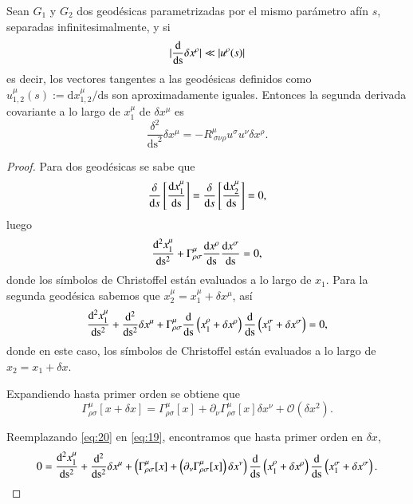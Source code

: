 \begin{theorem}
\label{teo:1}
Sean $G_1$ y $G_2$ dos geodésicas parametrizadas por el mismo parámetro afín $s$, separadas infinitesimalmente, y si 
$$|\dv{ }{ \mathrm{s} } \delta x^{\rho}| \ll |u^{\rho}(s)|$$
es decir, los vectores tangentes a las geodésicas definidos como $u^{\mu}_{1,2}(s) := \mathrm{d}x^{\mu}_{1,2}/\mathrm{ds}$ son aproximadamente iguales. Entonces la segunda derivada covariante a lo largo de $x^{\mu}_1$ de $\delta x^{\mu}$ es
\begin{equation}
\label{eq:17}
\frac{\delta^2}{\mathrm{ds}^2}\delta x^{\mu} = - R^{\mu}_{\ \sigma \nu \rho} u^{\sigma} u^{\nu} \delta x^{\rho}.
\end{equation}
\end{theorem}
\begin{proof}
Para dos geodésicas se sabe que
\begin{equation}
\frac{\delta  }{\mathrm{d}s}\left[ \dv{x_1^{\mu}}{\mathrm{s}} \right] = \frac{\delta  }{\mathrm{d}s}\left[ \dv{x_2^{\mu}}{\mathrm{s}} \right] = 0,
\end{equation}
luego
\begin{equation}
\label{eq:18}
\dv[2]{x_1^{\mu}}{\mathrm{s}} + \Gamma^{\mu}_{\rho \sigma} \dv{x^{\rho}}{\mathrm{s}} \dv{x^{\sigma}}{\mathrm{s}} = 0,
\end{equation}
donde los símbolos de Christoffel están evaluados a lo largo de $x_1$. Para la segunda geodésica sabemos que $x_2^{\mu} = x_1^{\mu} + \delta x^{\mu}$, así
\begin{equation}
\label{eq:19}
\dv[2]{x_1^{\mu}}{\mathrm{s}} + \dv[2]{ }{\mathrm{s}} \delta x^{\mu} + \Gamma^{\mu}_{\rho \sigma} \dv{ }{\mathrm{s}} \left( x_1^{\rho} + \delta x^{\rho} \right) \dv{ }{\mathrm{s}} \left( x_1^{\sigma} + \delta x^{\sigma} \right) = 0,
\end{equation}
donde en este caso, los símbolos de Christoffel están evaluados a lo largo de $x_2=x_1 + \delta x$. 

Expandiendo hasta primer orden se obtiene que
\begin{equation}
\label{eq:20}
\Gamma^{\mu}_{\rho \sigma}[x + \delta x] = \Gamma^{\mu}_{\rho \sigma}[x] + \partial_{\nu} \Gamma^{\mu}_{\rho \sigma}[x] \delta x^{\nu} + \mathcal{O}(\delta x^2).
\end{equation}

Reemplazando \eqref{eq:20} en \eqref{eq:19}, encontramos que hasta primer orden en $\delta x$,
\begin{equation}
0 = \dv[2]{x_1^{\mu}}{\mathrm{s}} + \dv[2]{ }{\mathrm{s}} \delta x^{\mu} + \left( \Gamma^{\mu}_{\rho \sigma}[x] + \left( \partial_{\nu} \Gamma^{\mu}_{\rho \sigma}[x] \right) \delta x^{\nu} \right) \dv{ }{\mathrm{s}} \left( x_1^{\rho} + \delta x^{\rho} \right) \dv{ }{\mathrm{s}} \left( x_1^{\sigma} + \delta x^{\sigma} \right).
\end{equation}


\end{proof}
